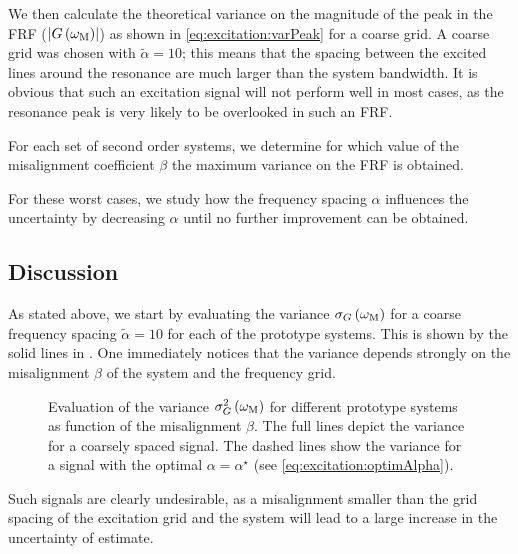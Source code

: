   We then calculate the theoretical variance on the magnitude of the peak in the \gls{FRF} ($\left|  G\left( \omega_{\mathrm{M}} \right)  \right|$) as shown in \eqref{eq:excitation:varPeak} for a coarse grid.
  A coarse grid was chosen with $\tilde{\alpha} = 10$; this means that the spacing between the excited lines around the resonance are much larger than the system bandwidth.
  It is obvious that such an excitation signal will not perform well in most cases, as the resonance peak is very likely to be overlooked in such an \gls{FRF}.
  
  For each set of second order systems, we determine for which value of the misalignment coefficient $\beta$ the maximum variance on the FRF is obtained.
  
  For these worst cases, we study how the frequency spacing $\alpha$ influences the uncertainty by decreasing $\alpha$ until no further improvement can be obtained.

  \subsection{Discussion} 
  \label{sec:excitation:bestFrequencyResolution}
  As stated above, we start by evaluating the variance $\sigma_G\left( \omega_{\mathrm{M}}\right)$ for a coarse frequency spacing $\tilde{\alpha} = 10$ for each of the prototype systems.
  This is shown by the solid lines in .
  One immediately notices that the variance depends strongly on the misalignment $\beta$ of the system and the frequency grid.
  
  \begin{figure}
    \centering
      \setlength{}
      \setlength\figureheight{0.68\figurewidth}
    
    \caption[Variance $\sigma_G^2\left( \wM \right)$ as a function of the grid misalignment $\beta$.]{Evaluation of the variance $\sigma_G^2\left( \wM \right) $ for different prototype systems as function of the misalignment $\beta$.
             The full lines depict the variance for a coarsely spaced signal.
             The dashed lines show the variance for a signal with the optimal $\alpha = \alpha^{\star}$ (see \eqref{eq:excitation:optimAlpha}).}
    \label{fig:excitation:worstCaseBeta}
  \end{figure}

  Such signals are clearly undesirable, as a misalignment smaller than the grid spacing of the excitation grid and the system will lead to a large increase in the uncertainty of estimate.
  
